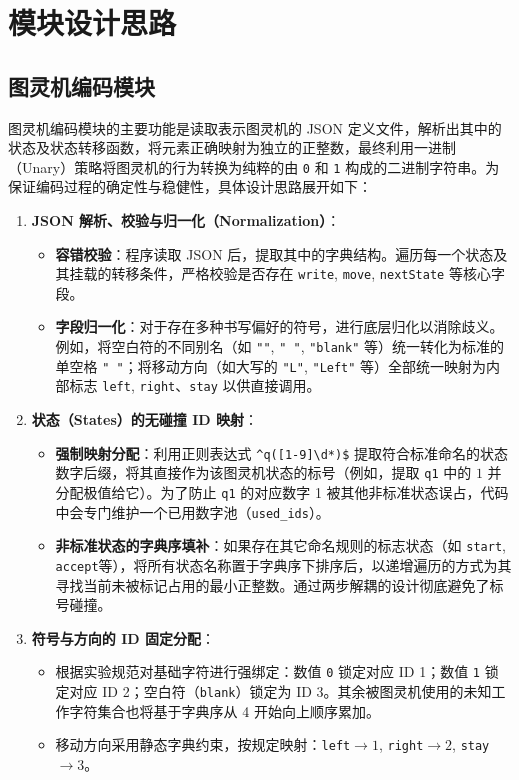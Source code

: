 \documentclass{sysucseexp}
\begin{document}
\section{模块设计思路}

\subsection{图灵机编码模块}
图灵机编码模块的主要功能是读取表示图灵机的 JSON 定义文件，解析出其中的状态及状态转移函数，将元素正确映射为独立的正整数，最终利用一进制（Unary）策略将图灵机的行为转换为纯粹的由 \texttt{0} 和 \texttt{1} 构成的二进制字符串。为保证编码过程的确定性与稳健性，具体设计思路展开如下：

\begin{enumerate}
    \item \textbf{JSON 解析、校验与归一化（Normalization）}：
    \begin{itemize}
        \item \textbf{容错校验}：程序读取 JSON 后，提取其中的字典结构。遍历每一个状态及其挂载的转移条件，严格校验是否存在 \texttt{write}, \texttt{move}, \texttt{nextState} 等核心字段。
        \item \textbf{字段归一化}：对于存在多种书写偏好的符号，进行底层归化以消除歧义。例如，将空白符的不同别名（如 \texttt{""}, \texttt{" "}, \texttt{"blank"} 等）统一转化为标准的单空格 \texttt{" "}；将移动方向（如大写的 \texttt{"L"}, \texttt{"Left"} 等）全部统一映射为内部标志 \texttt{left}, \texttt{right}、\texttt{stay} 以供直接调用。
    \end{itemize}

    \item \textbf{状态（States）的无碰撞 ID 映射}：
    \begin{itemize}
        \item \textbf{强制映射分配}：利用正则表达式 \texttt{\textasciicircum q([1-9]\textbackslash d*)\$} 提取符合标准命名的状态数字后缀，将其直接作为该图灵机状态的标号（例如，提取 \texttt{q1} 中的 $1$ 并分配极值给它）。为了防止 \texttt{q1} 的对应数字 1 被其他非标准状态误占，代码中会专门维护一个已用数字池（\texttt{used\_ids}）。
        \item \textbf{非标准状态的字典序填补}：如果存在其它命名规则的标志状态（如 \texttt{start}, \texttt{accept}等），将所有状态名称置于字典序下排序后，以递增遍历的方式为其寻找当前未被标记占用的最小正整数。通过两步解耦的设计彻底避免了标号碰撞。
    \end{itemize}

    \item \textbf{符号与方向的 ID 固定分配}：
    \begin{itemize}
        \item 根据实验规范对基础字符进行强绑定：数值 \texttt{0} 锁定对应 ID 1；数值 \texttt{1} 锁定对应 ID 2；空白符（\texttt{blank}）锁定为 ID 3。其余被图灵机使用的未知工作字符集合也将基于字典序从 4 开始向上顺序累加。
        \item 移动方向采用静态字典约束，按规定映射：\texttt{left}$\rightarrow 1$, \texttt{right}$\rightarrow 2$, \texttt{stay}$\rightarrow 3$。
    \end{itemize}


\end{enumerate}
\end{document}
